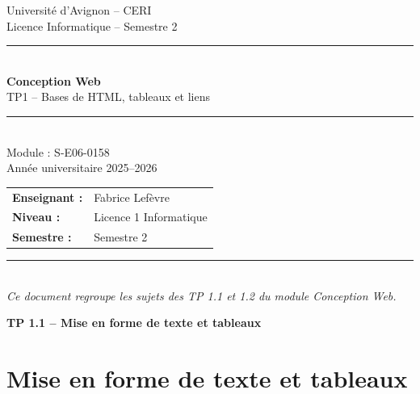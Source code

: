\documentclass[a4paper,11pt]{article}
\begin{document}
\thispagestyle{empty}
\vspace*{3cm}

\begin{center}
    {\small\textcolor{violetuniv}{Université d'Avignon -- CERI}}\\[0.5cm]
    {\small\textcolor{violetuniv}{Licence Informatique -- Semestre 2}}\\[2cm]

    {\rule{\linewidth}{0.5pt}}\\[0.4cm]
    {\LARGE\bfseries Conception Web}\\[0.3cm]
    {\large TP1 -- Bases de HTML, tableaux et liens}\\[0.4cm]
    {\rule{\linewidth}{0.5pt}}\\[2cm]

    {\large Module : S-E06-0158}\\[0.5cm]
    {\large Année universitaire 2025--2026}\\[3cm]

    \begin{tabular}{ll}
        \textbf{Enseignant :} & Fabrice Lefèvre \\
        \textbf{Niveau :}     & Licence 1 Informatique \\
        \textbf{Semestre :}   & Semestre 2 \\
    \end{tabular}
\end{center}

\vfill

\begin{center}
    \textcolor{borduregrise}{\rule{\linewidth}{0.3pt}}\\[0.3cm]
    {\small\textit{Ce document regroupe les sujets des TP 1.1 et 1.2 du module Conception Web.}}
\end{center}

\newpage
{}

{\Large\bfseries TP 1.1 -- Mise en forme de texte et tableaux}

\bigskip

\section{Mise en forme de texte et tableaux}
\end{document}
